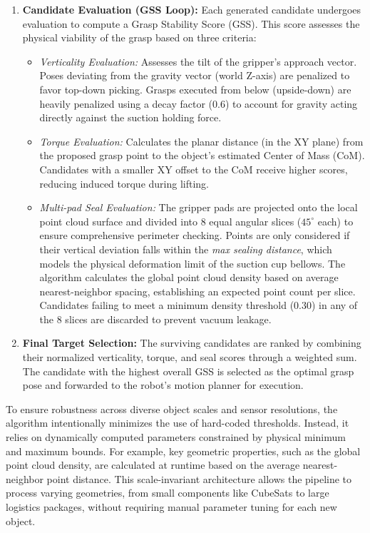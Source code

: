 \documentclass[12pt, a4paper]{article}
\begin{document}
\begin{enumerate}
    \item \textbf{Candidate Evaluation (GSS Loop):}
    Each generated candidate undergoes evaluation to compute a Grasp Stability Score (GSS). This score assesses the physical viability of the grasp based on three criteria:
    \begin{itemize}
        \item \textit{Verticality Evaluation:} Assesses the tilt of the gripper's approach vector. Poses deviating from the gravity vector (world Z-axis) are penalized to favor top-down picking. Grasps executed from below (upside-down) are heavily penalized using a decay factor (0.6) to account for gravity acting directly against the suction holding force.
        \item \textit{Torque Evaluation:} Calculates the planar distance (in the XY plane) from the proposed grasp point to the object's estimated Center of Mass (CoM). Candidates with a smaller XY offset to the CoM receive higher scores, reducing induced torque during lifting.
        \item \textit{Multi-pad Seal Evaluation:} The gripper pads are projected onto the local point cloud surface and divided into 8 equal angular slices ($45^\circ$ each) to ensure comprehensive perimeter checking. Points are only considered if their vertical deviation falls within the \textit{max sealing distance}, which models the physical deformation limit of the suction cup bellows. The algorithm calculates the global point cloud density based on average nearest-neighbor spacing, establishing an expected point count per slice. Candidates failing to meet a minimum density threshold (0.30) in any of the 8 slices are discarded to prevent vacuum leakage.
    \end{itemize}

    \item \textbf{Final Target Selection:}
    The surviving candidates are ranked by combining their normalized verticality, torque, and seal scores through a weighted sum. The candidate with the highest overall GSS is selected as the optimal grasp pose and forwarded to the robot's motion planner for execution.
\end{enumerate}

\par To ensure robustness across diverse object scales and sensor resolutions, the algorithm intentionally minimizes the use of hard-coded thresholds. Instead, it relies on dynamically computed parameters constrained by physical minimum and maximum bounds. For example, key geometric properties, such as the global point cloud density, are calculated at runtime based on the average nearest-neighbor point distance. This scale-invariant architecture allows the pipeline to process varying geometries, from small components like CubeSats to large logistics packages, without requiring manual parameter tuning for each new object.
\end{document}
